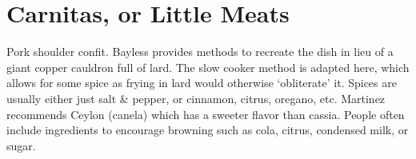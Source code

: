 \section[Carnitas]{Carnitas, or Little Meats}

\begin{recipestats}[
        servings=8,
        preptime=45~\minute,
        bakingtime=5~\hour,
        source=Mike \& Jane,
        original=Rick~\cite{baylessCarnitas} \& Rick~\cite{martinezCarnitas},
    ]
\end{recipestats}

\begin{recipeabstract}
    Pork shoulder confit.
    Bayless provides methods to recreate the dish in lieu of a giant copper
    cauldron full of lard.
    The slow cooker method is adapted here, which allows for some spice as
    frying in lard would otherwise `obliterate' it.
    Spices are usually either just salt \& pepper, or cinnamon, citrus, oregano, etc.
    Martinez recommends Ceylon (canela) which has a sweeter flavor than cassia.
    People often include ingredients to encourage browning such as cola,
    citrus, condensed milk, or sugar.
\end{recipeabstract}

\begin{ingredientcolumns}
    \begin{ingredientblock}
        \\
        \\
        \\
        \\
        \\
        \\
        \\
    \end{ingredientblock}
    \begin{ingredientblock}
        \\
        \\
        \\
        \\
        \\
        \\
        \\
    \end{ingredientblock}
\end{ingredientcolumns}

